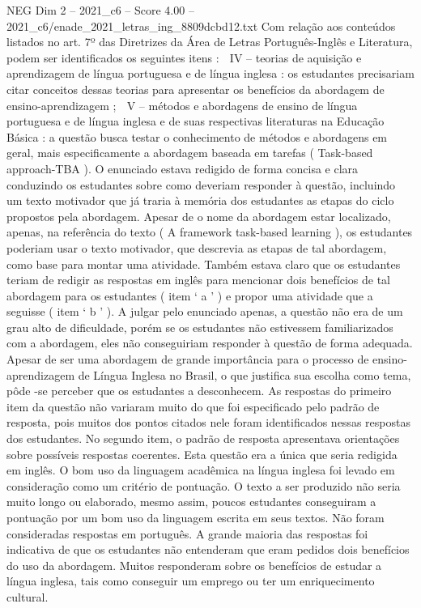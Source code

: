 \begin{textsample}{NEG Dim 2 – 2021\_c6 – Score 4.00 – 2021\_c6/enade\_2021\_letras\_ing\_8809dcbd12.txt}
Com relação aos conteúdos listados no art. 7º das Diretrizes da Área de Letras Português-Inglês e Literatura, podem ser identificados os seguintes itens :  IV – teorias de aquisição e aprendizagem de língua portuguesa e de língua inglesa : os estudantes precisariam citar conceitos dessas teorias para apresentar os benefícios da abordagem de ensino-aprendizagem ;  V – métodos e abordagens de ensino de língua portuguesa e de língua inglesa e de suas respectivas literaturas na Educação Básica : a questão busca testar o conhecimento de métodos e abordagens em geral, mais especificamente a abordagem baseada em tarefas ( Task-based approach-TBA ).
O enunciado estava redigido de forma concisa e clara conduzindo os estudantes sobre como deveriam responder à questão, incluindo um texto motivador que já traria à memória dos estudantes as etapas do ciclo propostos pela abordagem.
Apesar de o nome da abordagem estar localizado, apenas, na referência do texto ( A framework task-based learning ), os estudantes poderiam usar o texto motivador, que descrevia as etapas de tal abordagem, como base para montar uma atividade.
Também estava claro que os estudantes teriam de redigir as respostas em inglês para mencionar dois benefícios de tal abordagem para os estudantes ( item ‘ a ’ ) e propor uma atividade que a seguisse ( item ‘ b ’ ).
A julgar pelo enunciado apenas, a questão não era de um grau alto de dificuldade, porém se os estudantes não estivessem familiarizados com a abordagem, eles não conseguiriam responder à questão de forma adequada.
Apesar de ser uma abordagem de grande importância para o processo de ensino-aprendizagem de Língua Inglesa no Brasil, o que justifica sua escolha como tema, pôde -se perceber que os estudantes a desconhecem.
As respostas do primeiro item da questão não variaram muito do que foi especificado pelo padrão de resposta, pois muitos dos pontos citados nele foram identificados nessas respostas dos estudantes.
No segundo item, o padrão de resposta apresentava orientações sobre possíveis respostas coerentes.
Esta questão era a única que seria redigida em inglês.
O bom uso da linguagem acadêmica na língua inglesa foi levado em consideração como um critério de pontuação.
O texto a ser produzido não seria muito longo ou elaborado, mesmo assim, poucos estudantes conseguiram a pontuação por um bom uso da linguagem escrita em seus textos.
Não foram consideradas respostas em português.
A grande maioria das respostas foi indicativa de que os estudantes não entenderam que eram pedidos dois benefícios do uso da abordagem.
Muitos responderam sobre os benefícios de estudar a língua inglesa, tais como conseguir um emprego ou ter um enriquecimento cultural.

\end{textsample}
